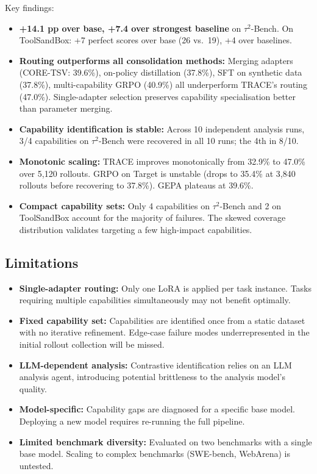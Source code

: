 \documentclass[11pt]{article}
\begin{document}
Key findings:

\begin{itemize}
    \item \textbf{+14.1 pp over base, +7.4 over strongest baseline} on $\tau^{2}$-Bench. On ToolSandBox: +7 perfect scores over base (26 vs.\ 19), +4 over baselines.

    \item \textbf{Routing outperforms all consolidation methods:} Merging adapters (CORE-TSV: 39.6\%), on-policy distillation (37.8\%), SFT on synthetic data (37.8\%), multi-capability GRPO (40.9\%) all underperform TRACE's routing (47.0\%). Single-adapter selection preserves capability specialisation better than parameter merging.

    \item \textbf{Capability identification is stable:} Across 10 independent analysis runs, 3/4 capabilities on $\tau^{2}$-Bench were recovered in all 10 runs; the 4th in 8/10.

    \item \textbf{Monotonic scaling:} TRACE improves monotonically from 32.9\% to 47.0\% over 5{,}120 rollouts. GRPO on Target is unstable (drops to 35.4\% at 3{,}840 rollouts before recovering to 37.8\%). GEPA plateaus at 39.6\%.

    \item \textbf{Compact capability sets:} Only 4 capabilities on $\tau^{2}$-Bench and 2 on ToolSandBox account for the majority of failures. The skewed coverage distribution validates targeting a few high-impact capabilities.
\end{itemize}

\subsection{Limitations}

\begin{itemize}
    \item \textbf{Single-adapter routing:} Only one LoRA is applied per task instance. Tasks requiring multiple capabilities simultaneously may not benefit optimally.
    \item \textbf{Fixed capability set:} Capabilities are identified once from a static dataset with no iterative refinement. Edge-case failure modes underrepresented in the initial rollout collection will be missed.
    \item \textbf{LLM-dependent analysis:} Contrastive identification relies on an LLM analysis agent, introducing potential brittleness to the analysis model's quality.
    \item \textbf{Model-specific:} Capability gaps are diagnosed for a specific base model. Deploying a new model requires re-running the full pipeline.
    \item \textbf{Limited benchmark diversity:} Evaluated on two benchmarks with a single base model. Scaling to complex benchmarks (SWE-bench, WebArena) is untested.
\end{itemize}
\end{document}
